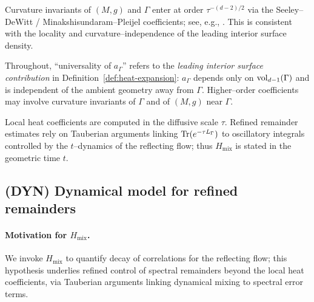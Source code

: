 \begin{remark}\label{rem:seeley-dewitt}
Curvature invariants of $(M,g)$ and $\Gamma$ enter at order $\tau^{-(d-2)/2}$ via the Seeley–DeWitt / Minakshisundaram–Pleijel coefficients; see, e.g., \cite[Ch.~1]{Gilkey1995}.
This is consistent with the locality and curvature–independence of the leading interior surface density.
\end{remark}

\begin{convention}\label{conv:universality}
Throughout, “universality of $a_\Gamma$” refers to the \emph{leading interior surface contribution} in Definition~\ref{def:heat-expansion}:
$a_\Gamma$ depends only on $\operatorname{vol}_{d-1}(\Gamma)$ and is independent of the ambient geometry away from $\Gamma$.
Higher–order coefficients may involve curvature invariants of $\Gamma$ and of $(M,g)$ near $\Gamma$.
\end{convention}

\begin{remark}\label{rem:tau-vs-t}
Local heat coefficients are computed in the diffusive scale $\tau$.
Refined remainder estimates rely on Tauberian arguments linking $\operatorname{Tr}(e^{-\tau L_\Gamma})$ to oscillatory integrals controlled by the $t$–dynamics of the reflecting flow; thus $H_{\mathrm{mix}}$ is stated in the geometric time $t$.
\end{remark}

\subsection{(DYN) Dynamical model for refined remainders}

\paragraph{Motivation for $H_{\mathrm{mix}}$.}
We invoke $H_{\mathrm{mix}}$ to quantify decay of correlations for the reflecting flow; this hypothesis underlies refined control of spectral remainders beyond the local heat coefficients, via Tauberian arguments linking dynamical mixing to spectral error terms.

